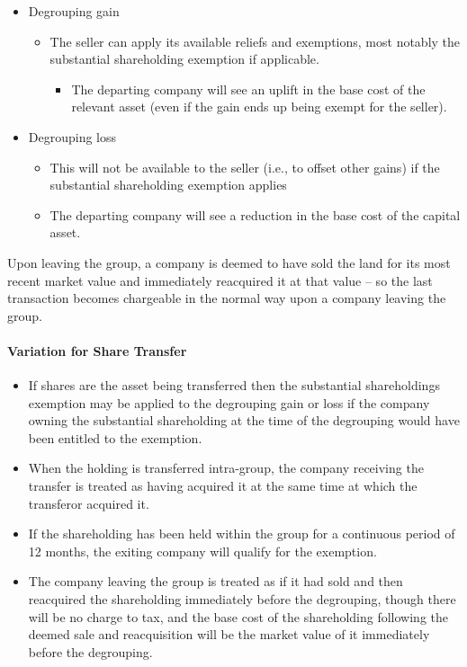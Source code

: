 \documentclass[
]{article}
\providecommand{\tightlist}{%
  \setlength{\itemsep}{0pt}\setlength{\parskip}{0pt}}
\begin{document}
\begin{itemize}
\tightlist
\item
  Degrouping gain

  \begin{itemize}
  \tightlist
  \item
    The seller can apply its available reliefs and exemptions, most
    notably the substantial shareholding exemption if applicable.

    \begin{itemize}
    \tightlist
    \item
      The departing company will see an uplift in the base cost of the
      relevant asset (even if the gain ends up being exempt for the
      seller).
    \end{itemize}
  \end{itemize}
\item
  Degrouping loss

  \begin{itemize}
  \tightlist
  \item
    This will not be available to the seller (i.e., to offset other
    gains) if the substantial shareholding exemption applies
  \item
    The departing company will see a reduction in the base cost of the
    capital asset.
  \end{itemize}
\end{itemize}

Upon leaving the group, a company is deemed to have sold the land for
its most recent market value and immediately reacquired it at that value
-- so the last transaction becomes chargeable in the normal way upon a
company leaving the group.

\hypertarget{variation-for-share-transfer}{%
\paragraph{Variation for Share
Transfer}\label{variation-for-share-transfer}}

\begin{itemize}
\tightlist
\item
  If shares are the asset being transferred then the substantial
  shareholdings exemption may be applied to the degrouping gain or loss
  if the company owning the substantial shareholding at the time of the
  degrouping would have been entitled to the exemption.
\item
  When the holding is transferred intra-group, the company receiving the
  transfer is treated as having acquired it at the same time at which
  the transferor acquired it.
\item
  If the shareholding has been held within the group for a continuous
  period of 12 months, the exiting company will qualify for the
  exemption.
\item
  The company leaving the group is treated as if it had sold and then
  reacquired the shareholding immediately before the degrouping, though
  there will be no charge to tax, and the base cost of the shareholding
  following the deemed sale and reacquisition will be the market value
  of it immediately before the degrouping.
\end{itemize}
\end{document}
